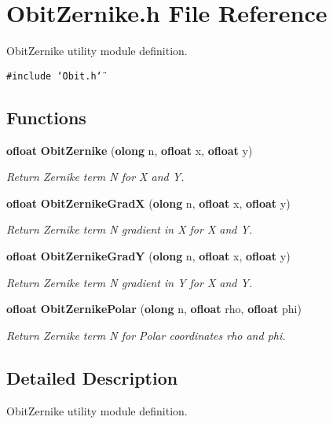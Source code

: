 \section{Obit\-Zernike.h File Reference}
\label{ObitZernike_8h}
Obit\-Zernike utility module definition. 

{\tt \#include \char`\"{}Obit.h\char`\"{}}\par
\subsection*{Functions}
\begin{CompactItemize}
\item 
{\bf ofloat} {\bf Obit\-Zernike} ({\bf olong} n, {\bf ofloat} x, {\bf ofloat} y)
\begin{CompactList}\small\item\em Return Zernike term N for X and Y. \item\end{CompactList}\item 
{\bf ofloat} {\bf Obit\-Zernike\-Grad\-X} ({\bf olong} n, {\bf ofloat} x, {\bf ofloat} y)
\begin{CompactList}\small\item\em Return Zernike term N gradient in X for X and Y. \item\end{CompactList}\item 
{\bf ofloat} {\bf Obit\-Zernike\-Grad\-Y} ({\bf olong} n, {\bf ofloat} x, {\bf ofloat} y)
\begin{CompactList}\small\item\em Return Zernike term N gradient in Y for X and Y. \item\end{CompactList}\item 
{\bf ofloat} {\bf Obit\-Zernike\-Polar} ({\bf olong} n, {\bf ofloat} rho, {\bf ofloat} phi)
\begin{CompactList}\small\item\em Return Zernike term N for Polar coordinates rho and phi. \item\end{CompactList}\end{CompactItemize}


\subsection{Detailed Description}
Obit\-Zernike utility module definition. 

